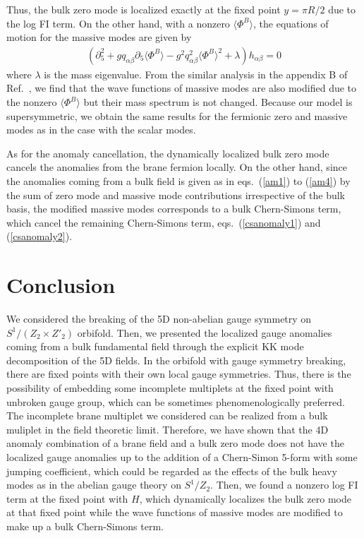 \documentclass[a4paper,12pt]{article}
\begin{document}
Thus, the bulk zero mode is localized exactly at the fixed point $y=\pi R/2$
due to the log FI term. 
On the other hand, with a nonzero $\langle\Phi^B\rangle$, 
the equations of motion for the massive modes are given by
\begin{eqnarray}
(\partial^2_5+gq_{\alpha\beta}\partial_5\langle\Phi^B\rangle
-g^2q_{\alpha\beta}^2\langle\Phi^B\rangle^2+\lambda)h_{\alpha\beta}=0 
\end{eqnarray}
where $\lambda$ is the mass eigenvalue.
From the similar analysis in the appendix B of Ref.~\cite{nilles}, we find 
that the wave functions of massive modes are also modified due
to the nonzero $\langle\Phi^B\rangle$ but their mass spectrum is not changed.  
Because our model is supersymmetric, we obtain the same results
for the fermionic zero and massive modes as in the case with the scalar modes. 

As for the anomaly cancellation, the dynamically
localized bulk zero mode cancels the anomalies from the brane fermion locally.
On the other hand, since the anomalies coming from a bulk field is given 
as in eqs.~(\ref{am1}) to (\ref{am4}) by
the sum of zero mode and massive mode contributions irrespective of the bulk 
basis, the modified massive modes corresponds to a bulk Chern-Simons term, 
which cancel the remaining Chern-Simons term, eqs.~(\ref{csanomaly1}) 
and (\ref{csanomaly2}).


\section{Conclusion}
We considered the breaking of the 5D non-abelian gauge symmetry 
on $S^1/(Z_2\times Z'_2)$ orbifold. 
Then, we presented the localized gauge anomalies coming from a bulk 
fundamental field through the explicit KK mode decomposition of the 5D fields. 
In the orbifold with gauge symmetry breaking, there are fixed points with their
own local gauge symmetries. Thus, there is the possibility of embedding
some incomplete multiplets at the fixed point with unbroken gauge group,
which can be sometimes phenomenologically preferred. The incomplete brane 
multiplet we considered can be realized from a bulk muliplet in the field 
theoretic limit. Therefore, we have shown that
the 4D anomaly combination of a brane field and a bulk zero mode  
does not have the localized gauge anomalies 
up to the addition of a Chern-Simon 5-form with some jumping coefficient, 
which could be regarded as the effects of the bulk heavy modes as in the 
abelian gauge theory on $S^1/Z_2$.  
Then, we found a nonzero log FI term at the fixed point with $H$, 
which dynamically localizes the bulk zero mode at that fixed point 
while the wave functions of massive modes are modified to make up a bulk 
Chern-Simons term. 
\end{document}
